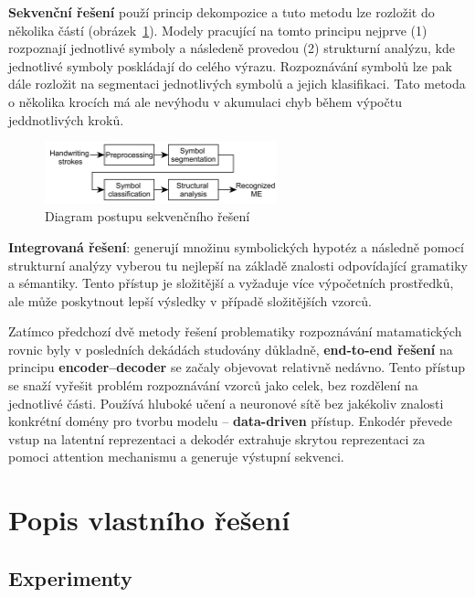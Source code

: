 \textbf{Sekvenční řešení} použí princip dekompozice a tuto metodu lze rozložit do několika částí (obrázek~\ref{img:seq_sol}). Modely pracující na tomto principu nejprve (1) rozpoznají jednotlivé symboly a následeně provedou (2) strukturní analýzu, kde jednotlivé symboly poskládají do celého výrazu. Rozpoznávání symbolů lze pak dále rozložit na segmentaci jednotlivých symbolů a jejich klasifikaci. Tato metoda o několika krocích má ale nevýhodu v akumulaci chyb během výpočtu jeddnotlivých kroků.

\begin{figure}[H]
    \centering
    \includegraphics[width=0.6\textwidth]{img/sequential_sol.png}
    \caption{Diagram postupu sekvenčního řešení}
    \label{img:seq_sol}
\end{figure}

\textbf{Integrovaná řešení}: generují množinu symbolických hypotéz a následně pomocí strukturní analýzy vyberou tu nejlepší na základě znalosti odpovídající gramatiky a sémantiky. Tento přístup je složitější a vyžaduje více výpočetních prostředků, ale může poskytnout lepší výsledky v případě složitějších vzorců.

Zatímco předchozí dvě metody řešení problematiky rozpoznávání matamatických rovnic byly v posledních dekádách studovány důkladně, \textbf{end-to-end řešení} na principu \textbf{encoder--decoder} se začaly objevovat relativně nedávno. Tento přístup se snaží vyřešit problém rozpoznávání vzorců jako celek, bez rozdělení na jednotlivé části. Používá hluboké učení a neuronové sítě bez jakékoliv znalosti konkrétní domény pro tvorbu modelu -- \textbf{data-driven} přístup. Enkodér převede vstup na latentní reprezentaci a dekodér extrahuje skrytou reprezentaci za pomoci attention mechanismu a generuje výstupní sekvenci. 



\section{Popis vlastního řešení}

\subsection{Experimenty}

